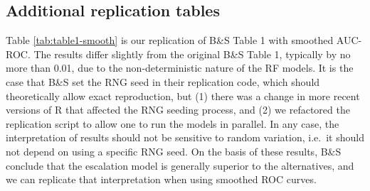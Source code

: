 \documentclass[
]{article}
\begin{document}
\hypertarget{additional-replication-tables}{%
\subsection{Additional replication tables}\label{additional-replication-tables}}

Table \ref{tab:table1-smooth} is our replication of B\&S Table 1 with smoothed AUC-ROC. The results differ slightly from the original B\&S Table 1, typically by no more than 0.01, due to the non-deterministic nature of the RF models. It is the case that B\&S set the RNG seed in their replication code, which should theoretically allow exact reproduction, but (1) there was a change in more recent versions of R that affected the RNG seeding process, and (2) we refactored the replication script to allow one to run the models in parallel. In any case, the interpretation of results should not be sensitive to random variation, i.e.~it should not depend on using a specific RNG seed. On the basis of these results, B\&S conclude that the escalation model is generally superior to the alternatives, and we can replicate that interpretation when using smoothed ROC curves.
\end{document}
